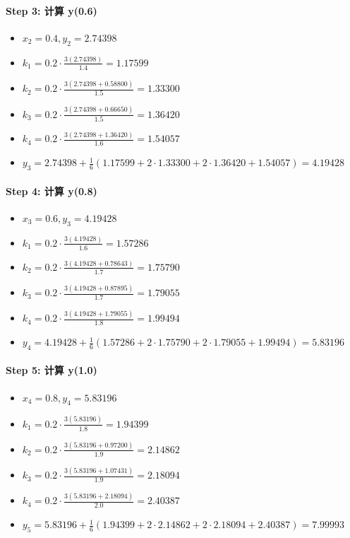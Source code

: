 \documentclass[11pt]{article}
\providecommand{\tightlist}{%
      \setlength{\itemsep}{0pt}\setlength{\parskip}{0pt}}
\begin{document}
\paragraph{Step 3: 计算 y(0.6)}\label{step-3-ux8ba1ux7b97-y0.6-1}

\begin{itemize}
\tightlist
\item
  \(x_2 = 0.4, y_2 = 2.74398\)
\item
  \(k_1 = 0.2 \cdot \frac{3(2.74398)}{1.4} = 1.17599\)
\item
  \(k_2 = 0.2 \cdot \frac{3(2.74398 + 0.58800)}{1.5} = 1.33300\)
\item
  \(k_3 = 0.2 \cdot \frac{3(2.74398 + 0.66650)}{1.5} = 1.36420\)
\item
  \(k_4 = 0.2 \cdot \frac{3(2.74398 + 1.36420)}{1.6} = 1.54057\)
\item
  \(y_3 = 2.74398 + \frac{1}{6}(1.17599 + 2 \cdot 1.33300 + 2 \cdot 1.36420 + 1.54057) = \mathbf{4.19428}\)
\end{itemize}

\paragraph{Step 4: 计算 y(0.8)}\label{step-4-ux8ba1ux7b97-y0.8-1}

\begin{itemize}
\tightlist
\item
  \(x_3 = 0.6, y_3 = 4.19428\)
\item
  \(k_1 = 0.2 \cdot \frac{3(4.19428)}{1.6} = 1.57286\)
\item
  \(k_2 = 0.2 \cdot \frac{3(4.19428 + 0.78643)}{1.7} = 1.75790\)
\item
  \(k_3 = 0.2 \cdot \frac{3(4.19428 + 0.87895)}{1.7} = 1.79055\)
\item
  \(k_4 = 0.2 \cdot \frac{3(4.19428 + 1.79055)}{1.8} = 1.99494\)
\item
  \(y_4 = 4.19428 + \frac{1}{6}(1.57286 + 2 \cdot 1.75790 + 2 \cdot 1.79055 + 1.99494) = \mathbf{5.83196}\)
\end{itemize}

\paragraph{Step 5: 计算 y(1.0)}\label{step-5-ux8ba1ux7b97-y1.0-1}

\begin{itemize}
\tightlist
\item
  \(x_4 = 0.8, y_4 = 5.83196\)
\item
  \(k_1 = 0.2 \cdot \frac{3(5.83196)}{1.8} = 1.94399\)
\item
  \(k_2 = 0.2 \cdot \frac{3(5.83196 + 0.97200)}{1.9} = 2.14862\)
\item
  \(k_3 = 0.2 \cdot \frac{3(5.83196 + 1.07431)}{1.9} = 2.18094\)
\item
  \(k_4 = 0.2 \cdot \frac{3(5.83196 + 2.18094)}{2.0} = 2.40387\)
\item
  \(y_5 = 5.83196 + \frac{1}{6}(1.94399 + 2 \cdot 2.14862 + 2 \cdot 2.18094 + 2.40387) = \mathbf{7.99993}\)
\end{itemize}
\end{document}
